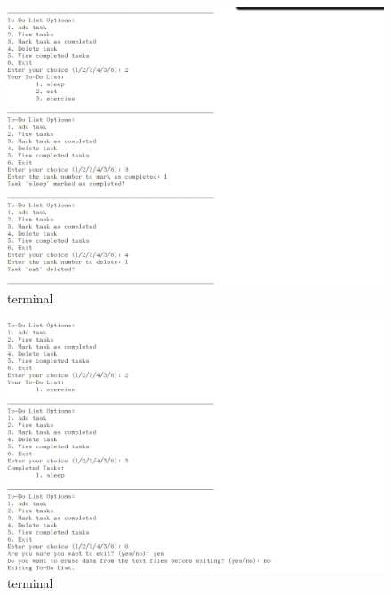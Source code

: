 \documentclass[12pt,a4paper]{report}
\begin{document}
\begin{figure}[htbp]
    \centering
    \includegraphics[width=1\textwidth]{./figs/2.png}
    \caption{terminal}
    \label{fig:ss2}
\end{figure}

\begin{figure}[htbp]
    \centering
    \includegraphics[width=1\textwidth]{./figs/3.png}
    \caption{terminal}
    \label{fig:ss3}
\end{figure}
\end{document}
